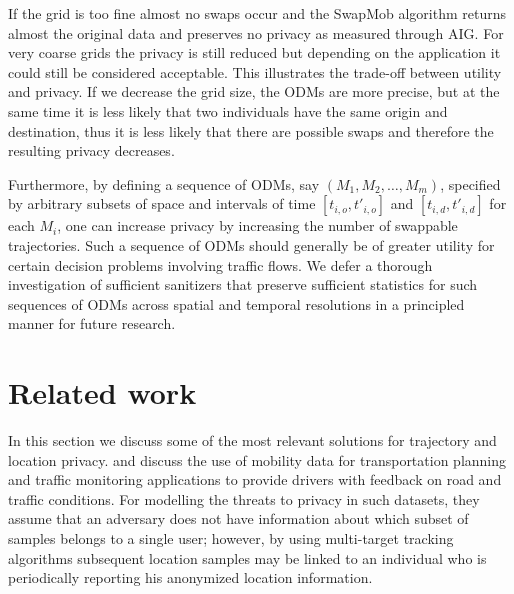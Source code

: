 \documentclass[times,twocolumn,final,authoryear]{elsarticle}
\begin{document}
If the grid is too fine almost no swaps occur
and the SwapMob algorithm returns almost the original data and preserves no privacy as measured through AIG. 
For very coarse grids the privacy is still reduced but depending on the application it could still
be considered acceptable. 
{\color{blue} This illustrates the trade-off between utility and privacy. If we decrease the grid size, the ODMs are more precise, but at the same time it is less likely that two individuals have the same origin and destination, thus it is less likely that there are possible swaps and therefore the resulting privacy decreases.
}

Furthermore, by defining a sequence of ODMs, say $(M_1,M_2,\ldots,M_m)$, specified by arbitrary subsets of space 
and intervals of time $[t_{i,o},t'_{i,o}]$ and $[t_{i,d},t'_{i,d}]$ for each $M_i$, one can increase privacy by increasing the number of swappable trajectories. Such a sequence of ODMs should generally be of greater utility for certain decision problems involving traffic flows. We defer a thorough investigation of sufficient sanitizers that preserve sufficient statistics for such sequences of ODMs across spatial and temporal resolutions in a principled manner for future research.  

\section{Related work}
{\color{blue} In this section we discuss some of the most relevant solutions for trajectory and location privacy.
}
%
%
%
\cite{Hoh2005} and \cite{Hoh06} discuss the use of mobility data for transportation planning and traffic monitoring applications to provide drivers with feedback on road and traffic conditions.
For modelling the threats to privacy in such datasets, they assume that an adversary does not have information about which subset of samples belongs to a single user; 
however, by using multi-target tracking algorithms \citep{Reid79analgorithm} subsequent location samples may be linked to an individual who is periodically reporting his anonymized location information.
\end{document}

